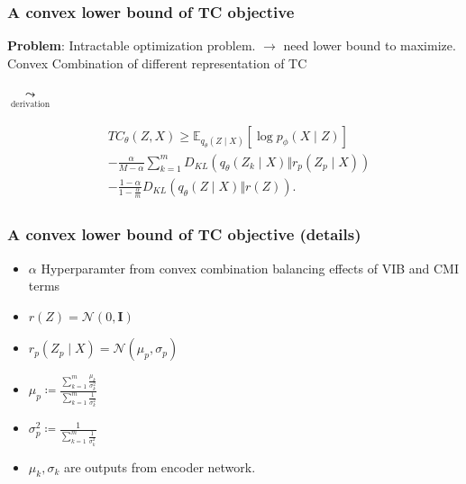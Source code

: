 \documentclass{beamer}
\newcommand{\E}{\mathbb{E}}
\theoremstyle{definition}
\begin{document}
    \begin{frame}
      \frametitle{A convex lower bound of TC objective}
      \textbf{Problem}: Intractable optimization problem.
\newline
      \vspace{.5 cm}
      $\to$ need lower bound to maximize.
      \newline
      Convex Combination of different representation of TC
      \begin{center}
        $\underset{\text{derivation}}{\leadsto}$
      \end{center}
      \begin{align*}
        \begin{split}
          &TC_{\theta}(Z, X) \geq \E_{q_{\theta}(Z \mid X)}[\log p_{\phi}(X \mid Z)]\\
          &- \frac{\alpha}{M-\alpha} \sum_{k=1}^{m}D_{KL}(q_{\theta}(Z_{k} \mid X) \Vert r_{p}(Z_{p} \mid X))\\
          &- \frac{1-\alpha}{1 - \frac{\alpha}{m}}D_{KL}(q_{\theta}(Z \mid X) \Vert r(Z)).
        \end{split}
      \end{align*}
    \end{frame}
    \begin{frame}
      \frametitle{A convex lower bound of TC objective (details)}
      \begin{itemize}
              \item $\alpha$ Hyperparamter from convex combination balancing effects of VIB and CMI terms
        \item $r(Z) = \mathcal{N}(0, \mathbf{I})$
        \item $r_{p}(Z_{p} \mid X) = \mathcal{N}(\mu_{p}, \sigma_{p})$
        \item $\mu_{p} \coloneqq \frac{\sum_{k=1}^{m}\frac{\mu_{k}}{\sigma_{k}^{2}}}{\sum_{k=1}^{m}\frac{1}{\sigma_{k}^{2}}}$
        \item $\sigma_{p}^{2} \coloneqq \frac{1}{\sum_{k=1}^{m}\frac{1}{\sigma_{k}^{2}}}$
              \item $\mu_{k}, \sigma_{k}$ are outputs from encoder network.
      \end{itemize}
    \end{frame}
\end{document}
